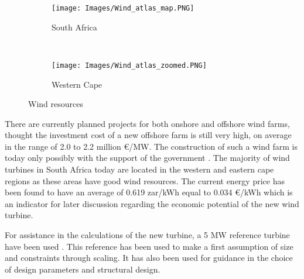 \begin{figure}[H] 
\centering
\begin{subfigure}{0.45\textwidth}
\texttt{[image: Images/Wind\_atlas\_map.PNG]} 
\caption{South Africa}
\label{fig:windsa}
\end{subfigure}~
\begin{subfigure}{0.423\textwidth}
\texttt{[image: Images/Wind\_atlas\_zoomed.PNG]}
\caption{Western Cape}
\label{fig:windlocation}
\end{subfigure}
\caption{Wind resources}
\label{fig:windrs}
\end{figure}

There are currently planned projects for both onshore and offshore wind farms, thought the investment cost of a new offshore farm is still very high, on average in the range of 2.0 to 2.2 million €/MW. The construction of such a wind farm is today only possibly with the support of the government \cite{offcost}. The majority of wind turbines in South Africa today are located in the western and eastern cape regions as these areas have good wind resources. The current energy price has been found to have an average of 0.619 zar/kWh equal to 0.034 €/kWh \cite{eprice} which is an indicator for later discussion regarding the economic potential of the new wind turbine.

For assistance in the calculations of the new turbine, a 5 MW reference turbine have been used \cite{5MW}. This reference has been used to make a first assumption of size and constraints through scaling. It has also been used for guidance in the choice of design parameters and structural design.
